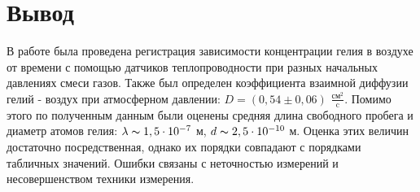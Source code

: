 \documentclass[a4paper,12pt]{article} %
\begin{document}
\section*{Вывод}
В работе была проведена регистрация зависимости концентрации гелия в воздухе от времени с помощью датчиков теплопроводности при разных начальных давлениях смеси газов. Также был определен коэффициента взаимной диффузии гелий - воздух при атмосферном давлении: $D = (0,54\pm 0,06)$ $\frac{\text{см}^2}{\text{c}}$. Помимо этого по полученным данным были оценены средняя длина свободного пробега и диаметр атомов гелия: $\lambda \thicksim 1,5\cdot 10^{-7}$ м, $d \thicksim 2,5\cdot 10^{-10}$ м. Оценка этих величин достаточно посредственная, однако их порядки совпадают с порядками табличных значений. Ошибки связаны с неточностью измерений и несовершенством техники измерения.
\end{document}
